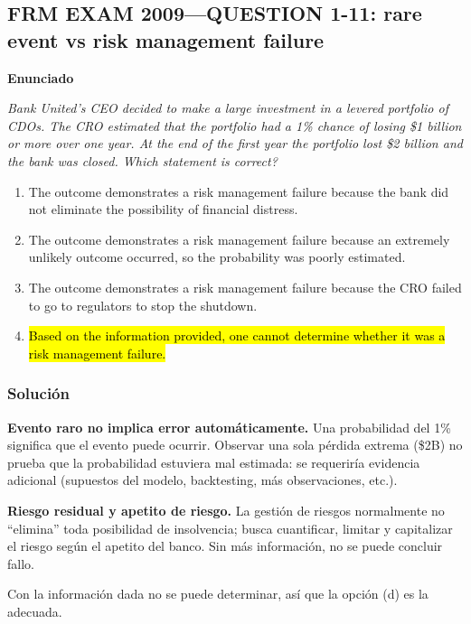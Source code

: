 ﻿\subsection{FRM EXAM 2009---QUESTION 1-11: rare event vs risk management failure}

\textbf{Enunciado}

\emph{Bank United’s CEO decided to make a large investment in a levered portfolio of CDOs. The CRO estimated that the portfolio had a 1\% chance of losing \$1 billion or more over one year. At the end of the first year the portfolio lost \$2 billion and the bank was closed. Which statement is correct?}
\begin{enumerate}[label=\alph*.]
\item The outcome demonstrates a risk management failure because the bank did not eliminate the possibility of financial distress.
\item The outcome demonstrates a risk management failure because an extremely unlikely outcome occurred, so the probability was poorly estimated.
\item The outcome demonstrates a risk management failure because the CRO failed to go to regulators to stop the shutdown.
\item \hl{Based on the information provided, one cannot determine whether it was a risk management failure.}
\end{enumerate}

\subsubsection*{Solución}


\textbf{Evento raro no implica error automáticamente. }Una probabilidad del 1\% significa que el evento puede ocurrir. Observar una sola pérdida extrema (\$2B) no prueba que la probabilidad estuviera mal estimada: se requeriría evidencia adicional (supuestos del modelo, backtesting, más observaciones, etc.).

\textbf{Riesgo residual y apetito de riesgo. } La gestión de riesgos normalmente no ``elimina'' toda posibilidad de insolvencia; busca cuantificar, limitar y capitalizar el riesgo según el apetito del banco. Sin más información, no se puede concluir fallo.


Con la información dada no se puede determinar, así que la opción (d) es la adecuada.












